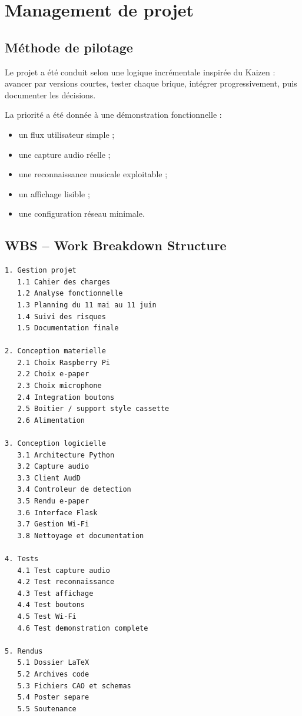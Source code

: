 \section{Management de projet}

\subsection{Méthode de pilotage}

Le projet a été conduit selon une logique incrémentale inspirée du Kaizen :
avancer par versions courtes, tester chaque brique, intégrer progressivement,
puis documenter les décisions.

La priorité a été donnée à une démonstration fonctionnelle :

\begin{itemize}
    \item un flux utilisateur simple ;
    \item une capture audio réelle ;
    \item une reconnaissance musicale exploitable ;
    \item un affichage lisible ;
    \item une configuration réseau minimale.
\end{itemize}

\subsection{WBS -- Work Breakdown Structure}

\begin{lstlisting}
1. Gestion projet
   1.1 Cahier des charges
   1.2 Analyse fonctionnelle
   1.3 Planning du 11 mai au 11 juin
   1.4 Suivi des risques
   1.5 Documentation finale

2. Conception materielle
   2.1 Choix Raspberry Pi
   2.2 Choix e-paper
   2.3 Choix microphone
   2.4 Integration boutons
   2.5 Boitier / support style cassette
   2.6 Alimentation

3. Conception logicielle
   3.1 Architecture Python
   3.2 Capture audio
   3.3 Client AudD
   3.4 Controleur de detection
   3.5 Rendu e-paper
   3.6 Interface Flask
   3.7 Gestion Wi-Fi
   3.8 Nettoyage et documentation

4. Tests
   4.1 Test capture audio
   4.2 Test reconnaissance
   4.3 Test affichage
   4.4 Test boutons
   4.5 Test Wi-Fi
   4.6 Test demonstration complete

5. Rendus
   5.1 Dossier LaTeX
   5.2 Archives code
   5.3 Fichiers CAO et schemas
   5.4 Poster separe
   5.5 Soutenance
\end{lstlisting}

